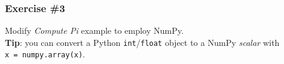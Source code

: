 \documentclass{beamer}
\begin{document}
\begin{frame}
  \frametitle{Exercise \#3}
  Modify \emph{Compute Pi} example to employ NumPy.\\
  \smallskip\smallskip
  \textbf{Tip}: you can convert a Python \texttt{int}/\texttt{float}
  object to a NumPy \emph{scalar} with \texttt{x~=~numpy.array(x)}.
\end{frame}

\end{document}
